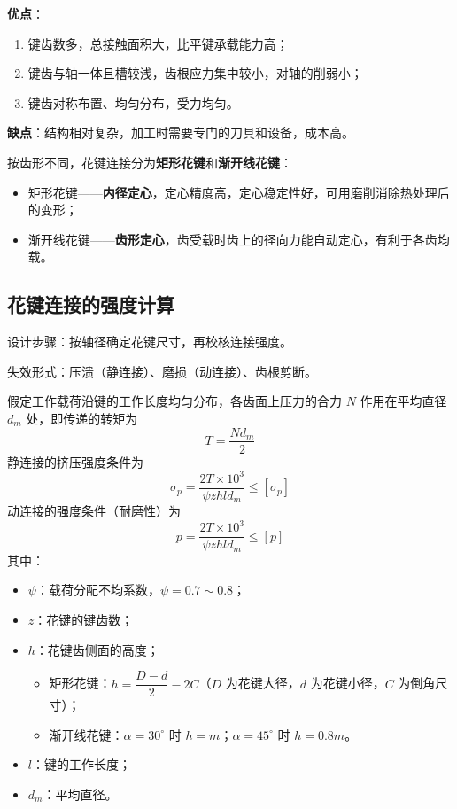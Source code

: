 \begin{definition}[花键连接的优缺点]
\label{def:花键优缺点}
\textbf{优点}：
\begin{enumerate}
	\item 键齿数多，总接触面积大，比平键承载能力高；
	\item 键齿与轴一体且槽较浅，齿根应力集中较小，对轴的削弱小；
	\item 键齿对称布置、均匀分布，受力均匀。
\end{enumerate}

\textbf{缺点}：结构相对复杂，加工时需要专门的刀具和设备，成本高。
\end{definition}

按齿形不同，花键连接分为\textbf{矩形花键}和\textbf{渐开线花键}：
\begin{itemize}
	\item 矩形花键——\textbf{内径定心}，定心精度高，定心稳定性好，可用磨削消除热处理后的变形；
	\item 渐开线花键——\textbf{齿形定心}，齿受载时齿上的径向力能自动定心，有利于各齿均载。
\end{itemize}

\subsection{花键连接的强度计算}
\label{sec:花键强度}

设计步骤：按轴径确定花键尺寸，再校核连接强度。

失效形式：压溃（静连接）、磨损（动连接）、齿根剪断。

假定工作载荷沿键的工作长度均匀分布，各齿面上压力的合力 $N$ 作用在平均直径 $d_m$ 处，即传递的转矩为
\begin{equation}
	T=\frac{Nd_m}{2}
	\label{eq:轴毂:花键转矩}
\end{equation}
静连接的挤压强度条件为
\begin{equation}
	\sigma_p=\frac{2T\times10^{3}}{\psi zhl d_m}\le[\sigma_p]
	\label{eq:轴毂:花键挤压强度}
\end{equation}
动连接的强度条件（耐磨性）为
\begin{equation}
	p=\frac{2T\times10^{3}}{\psi zhl d_m}\le[p]
	\label{eq:轴毂:花键耐磨性}
\end{equation}
其中：
\begin{itemize}
	\item $\psi$：载荷分配不均系数，$\psi=0.7\sim0.8$；
	\item $z$：花键的键齿数；
	\item $h$：花键齿侧面的高度；
	\begin{itemize}
		\item 矩形花键：$h=\dfrac{D-d}{2}-2C$（$D$ 为花键大径，$d$ 为花键小径，$C$ 为倒角尺寸）；
		\item 渐开线花键：$\alpha=30^{\circ}$ 时 $h=m$；$\alpha=45^{\circ}$ 时 $h=0.8m$。
	\end{itemize}
	\item $l$：键的工作长度；
	\item $d_m$：平均直径。
\end{itemize}

